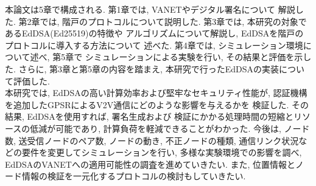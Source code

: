 本論文は5章で構成される. 第1章では, VANETやデジタル署名について
解説した. 第2章では, 階戸\cite{shinato}のプロトコルについて説明した. 
第3章では, 本研究の対象であるEdDSA(Ed25519)の特徴や
アルゴリズムについて解説し, EdDSAを階戸のプロトコルに導入する方法について
述べた. 第4章では, シミュレーション環境について述べ, 第5章で
シミュレーションによる実験を行い, その結果と評価を示した. さらに, 
第3章と第5章の内容を踏まえ, 本研究で行ったEdDSAの実装について評価した. \\
\indent 本研究では, EdDSAの高い計算効率および堅牢なセキュリティ性能が, 
認証機構を追加したGPSRによるV2V通信にどのような影響を与えるかを
検証した. その結果, EdDSAを使用すれば, 署名生成および
検証にかかる処理時間の短縮とリソースの低減が可能であり, 
計算負荷を軽減できることがわかった. 
\indent 今後は, ノード数, 送受信ノードのペア数, ノードの動き, 不正ノードの種類, 
通信リンク状況などの要件を変更してシミュレーションを行い, 
多様な実験環境での影響を調べ, EdDSAのVANETへの適用可能性の調査を進めていきたい. 
また, 位置情報とノード情報の検証を一元化するプロトコルの検討もしていきたい. 

